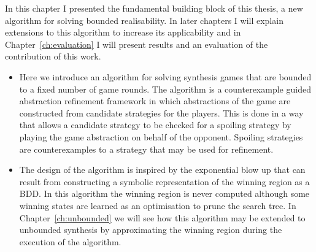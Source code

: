 In this chapter I presented the fundamental building block of this thesis, a new algorithm for solving bounded realisability. In later chapters I will explain extensions to this algorithm to increase its applicability and in Chapter~\ref{ch:evaluation} I will present results and an evaluation of the contribution of this work.

\begin{itemize}
    \item Here we introduce an algorithm for solving synthesis games that are bounded to a fixed number of game rounds. The algorithm is a counterexample guided abstraction refinement framework in which abstractions of the game are constructed from candidate strategies for the players. This is done in a way that allows a candidate strategy to be checked for a spoiling strategy by playing the game abstraction on behalf of the opponent. Spoiling strategies are counterexamples to a strategy that may be used for refinement.

    \item The design of the algorithm is inspired by the exponential blow up that can result from constructing a symbolic representation of the winning region as a BDD. In this algorithm the winning region is never computed although some winning states are learned as an optimisation to prune the search tree. In Chapter~\ref{ch:unbounded} we will see how this algorithm may be extended to unbounded synthesis by approximating the winning region during the execution of the algorithm.

\end{itemize}



